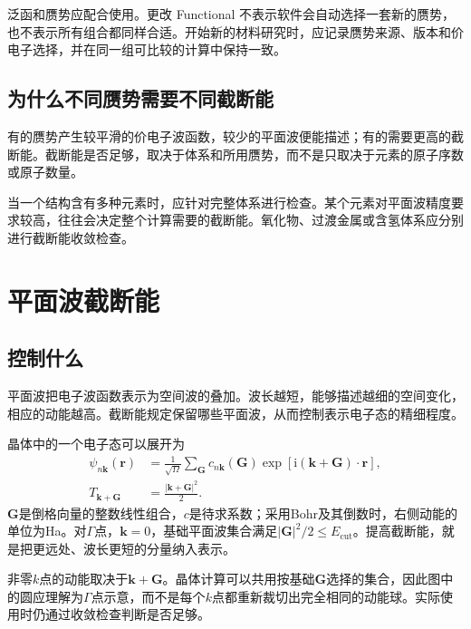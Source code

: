泛函和赝势应配合使用。更改 Functional 不表示软件会自动选择一套新的赝势，也不表示所有组合都同样合适。开始新的材料研究时，应记录赝势来源、版本和价电子选择，并在同一组可比较的计算中保持一致。

\subsection{为什么不同赝势需要不同截断能}

有的赝势产生较平滑的价电子波函数，较少的平面波便能描述；有的需要更高的截断能。截断能是否足够，取决于体系和所用赝势，而不是只取决于元素的原子序数或原子数量。

当一个结构含有多种元素时，应针对完整体系进行检查。某个元素对平面波精度要求较高，往往会决定整个计算需要的截断能。氧化物、过渡金属或含氢体系应分别进行截断能收敛检查。

\section{平面波截断能}

\subsection{ 控制什么}

平面波把电子波函数表示为空间波的叠加。波长越短，能够描述越细的空间变化，相应的动能越高。截断能规定保留哪些平面波，从而控制表示电子态的精细程度。


晶体中的一个电子态可以展开为
\begin{equation}
  \begin{aligned}
  \psi_{n\mathbf k}(\mathbf r)
   &=\frac{1}{\sqrt{\Omega}}\sum_{\mathbf G}
      c_{n\mathbf k}(\mathbf G)
      \exp\!\left[\mathrm i(\mathbf k+\mathbf G)\cdot\mathbf r\right],\\
  T_{\mathbf k+\mathbf G}&=\frac{|\mathbf k+\mathbf G|^2}{2}.
  \end{aligned}
  \label{eq:plane-wave-expansion}
\end{equation}
$\mathbf G$是倒格向量的整数线性组合，$c$是待求系数；采用Bohr及其倒数时，右侧动能的单位为Ha。对$\Gamma$点，$\mathbf k=0$，基础平面波集合满足$|\mathbf G|^2/2\leq E_{\mathrm{cut}}$。提高截断能，就是把更远处、波长更短的分量纳入表示。



非零$k$点的动能取决于$\mathbf k+\mathbf G$。晶体计算可以共用按基础$\mathbf G$选择的集合，因此图中的圆应理解为$\Gamma$点示意，而不是每个$k$点都重新裁切出完全相同的动能球。实际使用时仍通过收敛检查判断是否足够。

